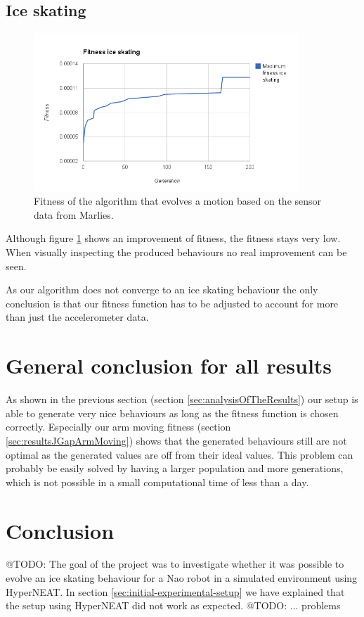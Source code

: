 \documentclass[a4paper,10pt]{article}
\begin{document}
\subsection{Ice skating}
\begin{figure}[h!]
\includegraphics[width=100mm]{images/iceskating}
\caption{Fitness of the algorithm that evolves a motion based on the sensor data from Marlies.}
\label{fig:iceskatingFitness}
\end{figure}

Although figure \ref{fig:iceskatingFitness} shows an improvement of fitness, the fitness stays very low. When visually inspecting the produced behaviours no real improvement can be seen. 

As our algorithm does not converge to an ice skating behaviour the only conclusion is that our fitness function has to be adjusted to account for more than just the accelerometer data. 

\section{General conclusion for all results}
As shown in the previous section (section \ref{sec:analysisOfTheResults}) our setup is able to generate very nice behaviours as long as the fitness function is chosen correctly. Especially our arm moving fitness (section \ref{sec:resultsJGapArmMoving}) shows that the generated behaviours still are not optimal as the generated values are off from their ideal values. This problem can probably be easily solved by having a larger population and more generations, which is not possible in a small computational time of less than a day. 


\section{Conclusion}
\label{sec:conclusion}
@TODO: The goal of the project was to investigate whether it was possible to evolve an ice skating behaviour for a Nao robot in a simulated environment using HyperNEAT. In section \ref{sec:initial-experimental-setup} we have explained that the setup using HyperNEAT did not work as expected. @TODO: ... problems
\end{document}
